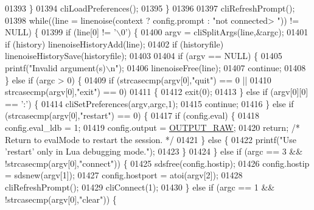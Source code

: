\begin{DoxyCode}
{{{{{{{{{{{{{{{{{{{{{{{{{{{{{{{{{{{{01393         \}
01394         cliLoadPreferences();
01395     \}
01396 
01397     cliRefreshPrompt();
01398     \textcolor{keywordflow}{while}((line = linenoise(context ? config.prompt : \textcolor{stringliteral}{"not connected> "})) != NULL) \{
01399         \textcolor{keywordflow}{if} (line[0] != \textcolor{stringliteral}{'\(\backslash\)0'}) \{
01400             argv = cliSplitArgs(line,&argc);
01401             \textcolor{keywordflow}{if} (history) linenoiseHistoryAdd(line);
01402             \textcolor{keywordflow}{if} (historyfile) linenoiseHistorySave(historyfile);
01403 
01404             \textcolor{keywordflow}{if} (argv == NULL) \{
01405                 printf(\textcolor{stringliteral}{"Invalid argument(s)\(\backslash\)n"});
01406                 linenoiseFree(line);
01407                 \textcolor{keywordflow}{continue};
01408             \} \textcolor{keywordflow}{else} \textcolor{keywordflow}{if} (argc > 0) \{
01409                 \textcolor{keywordflow}{if} (strcasecmp(argv[0],\textcolor{stringliteral}{"quit"}) == 0 ||
01410                     strcasecmp(argv[0],\textcolor{stringliteral}{"exit"}) == 0)
01411                 \{
01412                     exit(0);
01413                 \} \textcolor{keywordflow}{else} \textcolor{keywordflow}{if} (argv[0][0] == \textcolor{stringliteral}{':'}) \{
01414                     cliSetPreferences(argv,argc,1);
01415                     \textcolor{keywordflow}{continue};
01416                 \} \textcolor{keywordflow}{else} \textcolor{keywordflow}{if} (strcasecmp(argv[0],\textcolor{stringliteral}{"restart"}) == 0) \{
01417                     \textcolor{keywordflow}{if} (config.eval) \{
01418                         config.eval\_ldb = 1;
01419                         config.output = \hyperlink{redis-cli_8c_a4f47017b54da140967dcbd440fae227c}{OUTPUT\_RAW};
01420                         \textcolor{keywordflow}{return}; \textcolor{comment}{/* Return to evalMode to restart the session. */}
01421                     \} \textcolor{keywordflow}{else} \{
01422                         printf(\textcolor{stringliteral}{"Use 'restart' only in Lua debugging mode."});
01423                     \}
01424                 \} \textcolor{keywordflow}{else} \textcolor{keywordflow}{if} (argc == 3 && !strcasecmp(argv[0],\textcolor{stringliteral}{"connect"})) \{
01425                     sdsfree(config.hostip);
01426                     config.hostip = sdsnew(argv[1]);
01427                     config.hostport = atoi(argv[2]);
01428                     cliRefreshPrompt();
01429                     cliConnect(1);
01430                 \} \textcolor{keywordflow}{else} \textcolor{keywordflow}{if} (argc == 1 && !strcasecmp(argv[0],\textcolor{stringliteral}{"clear"})) \{
}}}}}}}}}}}}}}}}}}}}}}}}}}}}}}}}}}}}
\end{DoxyCode}

